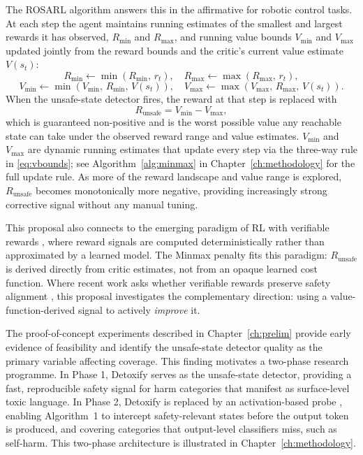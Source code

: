 \documentclass[a4paper,twoside,12pt]{report}
\newcommand{\runsafe}{R_{\text{unsafe}}}
\newcommand{\vmin}{V_{\min}}
\newcommand{\vmax}{V_{\max}}
\newcommand{\rmin}{R_{\min}}
\newcommand{\rmax}{R_{\max}}
\begin{document}
The ROSARL algorithm \citep{nanguetasse2026} answers this in the affirmative for robotic
control tasks. At each step the agent maintains running estimates of the smallest and
largest rewards it has observed, $\rmin$ and $\rmax$, and running value bounds $\vmin$
and $\vmax$ updated jointly from the reward bounds and the critic's current value
estimate $V(s_t)$:
\begin{equation}
  \rmin \leftarrow \min(\rmin,\, r_t), \quad
  \rmax \leftarrow \max(\rmax,\, r_t),
  \label{eq:rminmax}
\end{equation}
\begin{equation}
  \vmin \leftarrow \min(\vmin,\, \rmin,\, V(s_t)), \quad
  \vmax \leftarrow \max(\vmax,\, \rmax,\, V(s_t)).
  \label{eq:vbounds}
\end{equation}
When the unsafe-state detector fires, the reward at that step is replaced with
\begin{equation}
  \runsafe = \vmin - \vmax,
  \label{eq:minmax}
\end{equation}
which is guaranteed non-positive and is the worst possible value any reachable state can
take under the observed reward range and value estimates. $\vmin$ and $\vmax$ are dynamic
running estimates that update every step via the three-way rule in
\eqref{eq:vbounds}; see Algorithm~\ref{alg:minmax} in Chapter~\ref{ch:methodology} for the
full update rule. As more of the reward landscape and value range is explored, $\runsafe$
becomes monotonically more negative, providing increasingly strong corrective signal
without any manual tuning.

This proposal also connects to the emerging paradigm of RL with verifiable rewards
\citep{lambert2024rlvr, youssef2025grpo, su2025crossingreward}, where reward signals are
computed deterministically rather than approximated by a learned model. The Minmax penalty
fits this paradigm: $\runsafe$ is derived directly from critic estimates, not from an opaque
learned cost function. Where recent work asks whether verifiable rewards preserve safety
alignment \citep{safetyrlvr2025}, this proposal investigates the complementary direction:
using a value-function-derived signal to actively \emph{improve} it.

The proof-of-concept experiments described in Chapter~\ref{ch:prelim} provide early
evidence of feasibility and identify the unsafe-state detector quality as the primary
variable affecting coverage. This finding motivates a two-phase research programme. In Phase
1, Detoxify \citep{hanu2020detoxify} serves as the unsafe-state detector, providing a
fast, reproducible safety signal for harm categories that manifest as surface-level toxic
language. In Phase 2, Detoxify is replaced by an activation-based probe
\citep{rateike2023, han2025safeswitch}, enabling Algorithm~1 to intercept safety-relevant
states before the output token is produced, and covering categories that output-level
classifiers miss, such as self-harm. This two-phase architecture is illustrated in
Chapter~\ref{ch:methodology}.
\end{document}
